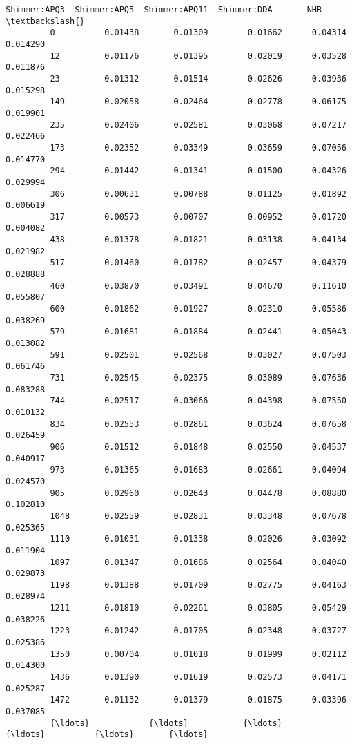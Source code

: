 \documentclass[11pt]{article}
\begin{document}
\begin{Verbatim}[commandchars=\\\{\}]
               Shimmer:APQ3  Shimmer:APQ5  Shimmer:APQ11  Shimmer:DDA       NHR  \textbackslash{}
         0          0.01438       0.01309        0.01662      0.04314  0.014290   
         12         0.01176       0.01395        0.02019      0.03528  0.011876   
         23         0.01312       0.01514        0.02626      0.03936  0.015298   
         149        0.02058       0.02464        0.02778      0.06175  0.019901   
         235        0.02406       0.02581        0.03068      0.07217  0.022466   
         173        0.02352       0.03349        0.03659      0.07056  0.014770   
         294        0.01442       0.01341        0.01500      0.04326  0.029994   
         306        0.00631       0.00788        0.01125      0.01892  0.006619   
         317        0.00573       0.00707        0.00952      0.01720  0.004082   
         438        0.01378       0.01821        0.03138      0.04134  0.021982   
         517        0.01460       0.01782        0.02457      0.04379  0.028888   
         460        0.03870       0.03491        0.04670      0.11610  0.055807   
         600        0.01862       0.01927        0.02310      0.05586  0.038269   
         579        0.01681       0.01884        0.02441      0.05043  0.013082   
         591        0.02501       0.02568        0.03027      0.07503  0.061746   
         731        0.02545       0.02375        0.03089      0.07636  0.083288   
         744        0.02517       0.03066        0.04398      0.07550  0.010132   
         834        0.02553       0.02861        0.03624      0.07658  0.026459   
         906        0.01512       0.01848        0.02550      0.04537  0.040917   
         973        0.01365       0.01683        0.02661      0.04094  0.024570   
         905        0.02960       0.02643        0.04478      0.08880  0.102810   
         1048       0.02559       0.02831        0.03348      0.07678  0.025365   
         1110       0.01031       0.01338        0.02026      0.03092  0.011904   
         1097       0.01347       0.01686        0.02564      0.04040  0.029873   
         1198       0.01388       0.01709        0.02775      0.04163  0.028974   
         1211       0.01810       0.02261        0.03805      0.05429  0.038226   
         1223       0.01242       0.01705        0.02348      0.03727  0.025386   
         1350       0.00704       0.01018        0.01999      0.02112  0.014300   
         1436       0.01390       0.01619        0.02573      0.04171  0.025287   
         1472       0.01132       0.01379        0.01875      0.03396  0.037085   
         {\ldots}            {\ldots}           {\ldots}            {\ldots}          {\ldots}       {\ldots}   

\end{Verbatim}
\end{document}
